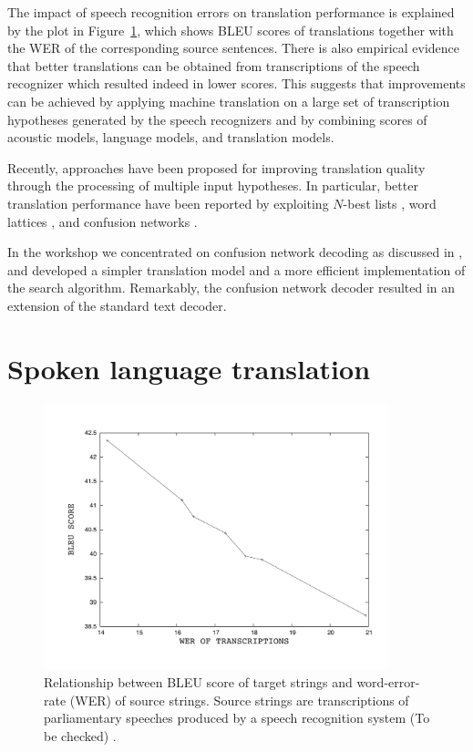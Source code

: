 \documentclass[11pt]{report}
\theoremstyle{plain}
\begin{document}
The impact of speech recognition errors on translation performance
is explained by the plot in Figure~\ref{fig:wer-bleu}, which shows BLEU scores of 
translations together with the WER of the corresponding source sentences.  There is
also empirical evidence that better translations can be obtained from 
transcriptions of the speech recognizer which resulted indeed in lower scores.  This
suggests that improvements can be achieved by applying machine translation on 
a large set of transcription hypotheses generated by the speech recognizers and by
combining scores of  acoustic models, language models, and translation models.



Recently, approaches have been
proposed for improving translation quality  through the processing of 
multiple input hypotheses.  In particular, better translation performance 
have been reported by exploiting   $N$-best lists \cite{zhang04,quan05},  word 
lattices \cite{matusov05,mathias06},   and confusion networks \cite{bertoldi05a}.  

\noindent
In the workshop we concentrated on confusion network decoding as  discussed in  
\cite{bertoldi05a}, and  developed a simpler translation model and a  more efficient 
implementation of the search algorithm.  Remarkably, the confusion network decoder  
resulted in an extension of  the standard text decoder.

\section{Spoken language translation}
\label{sec:slt}
\noindent

\begin{figure}[t]
\begin{center}
\label{fig:wer-bleu}
\caption{Relationship between BLEU score of target strings and word-error-rate (WER) of source strings. 
Source strings are transcriptions of parliamentary speeches produced by a speech recognition system (To be checked) .}
\includegraphics[width=10cm]{marcello-bleu-wer} 
\end{center}
\end{figure}
\end{document}
